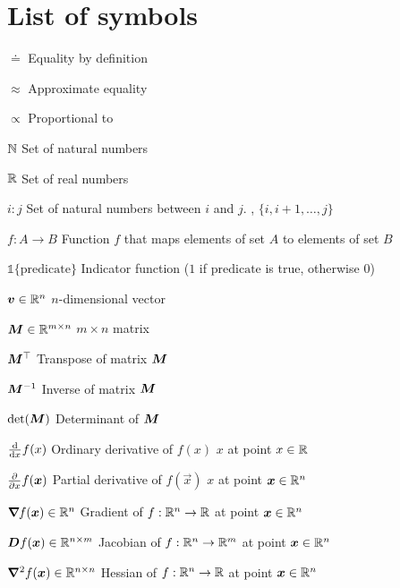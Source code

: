 \section*{List of symbols}

\vspace{10mm}

\begin{abbrv}
    \item[$\doteq$] Equality by definition
    \item[$\approx$] Approximate equality
    \item[$\propto$] Proportional to
    \item[$\mathbb{N}$] Set of natural numbers
    \item[$\mathbb{R}$] Set of real numbers
    \item[$i:j$] Set of natural numbers between $i$ and $j$. \Ie, $\{i, i+1,\ldots,j\}$
    \item[$f: A \to B$] Function $f$ that maps elements of set $A$ to elements of set $B$
    \item[$\mathbb{1}\{\mathrm{predicate}\}$] Indicator function ($1$ if $\mathrm{predicate}$ is true, otherwise $0$)

    \item

    \item[$\bm{v} \in \mathbb{R}^n$] $n$-dimensional vector
    \item[$\bm{M} \in \mathbb{R}^{m\times n}$] $m \times n$ matrix
    \item[$\bm{M}^\top$] Transpose of matrix $\bm{M}$
    \item[$\bm{M}^{-1}$] Inverse of matrix $\bm{M}$
    \item[$\det{\mat{M}}$] Determinant of $\bm{M}$

    \item

    \item[$\odv*{f(x)}{x}$] Ordinary derivative of $f(x)$ \wrt $x$ at point $x\in\mathbb{R}$
    \item[$\pdv*{f(\bm{x})}{x}$] Partial derivative of $f(\vec{x})$ \wrt $x$ at point $\bm{x}\in\mathbb{R}^n$
    \item[$\bm{\nabla}_{\! } f(\bm{x}) \in \mathbb{R}^n$] Gradient of $f: \mathbb{R}^n \to \mathbb{R}$ at point $\bm{x}\in\mathbb{R}^n$
    \item[$\bm{D}_{} f(\bm{x}) \in \mathbb{R}^{n\times m}$] Jacobian of $f: \mathbb{R}^n \to \mathbb{R}^m$ at point $\bm{x}\in\mathbb{R}^n$
    \item[$\bm{\nabla}^2_{\! } f(\bm{x}) \in \mathbb{R}^{n\times n}$] Hessian of $f: \mathbb{R}^n \to \mathbb{R}$ at point $\bm{x}\in\mathbb{R}^n$
\end{abbrv}
